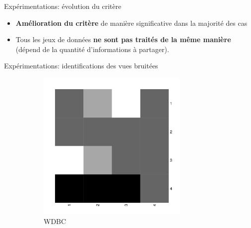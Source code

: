 \documentclass[hyperref={pdfpagelabels=false}]{beamer}
\begin{document}
\begin{frame}{Expérimentations: évolution du critère}
        \begin{itemize}
            \item \textbf{Amélioration du critère} de manière significative dans 
                la majorité des cas
            \item Tous les jeux de données \textbf{ne sont pas traités de la 
                même manière} (dépend de la quantité d'informations à partager).
        \end{itemize}
    \end{frame}

    \begin{frame}{Expérimentations: identifications des vues bruitées}
        \begin{figure}[b]
            \centering
            \caption{Cartes de chaleur des matrices de $\beta$ pour chaque jeu 
                de données. $M(i,j)$ correspond à l'importance accordée à la Vue 
                j par la Vue i.\\Blanc = forte collaboration - noir = faible 
                collaboration -  diagonale représente $\beta=1$.
            }
            \begin{subfigure}[b]{0.32\textwidth}
                \centering
                \includegraphics[width=0.8\textwidth]{wdbc_bw}
                \caption{WDBC}
            \end{subfigure}
            \begin{subfigure}[b]{0.32\textwidth}
                \centering

\end{subfigure}
\end{figure}
\end{frame}
\end{document}
